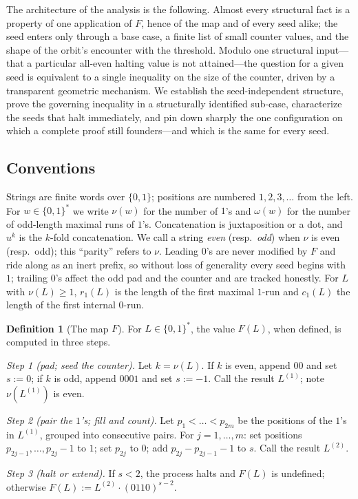 \documentclass[11pt,reqno]{amsart}
\theoremstyle{plain}
\theoremstyle{definition}
\newtheorem{definition}{Definition}
\theoremstyle{remark}
\begin{document}
The architecture of the analysis is the following. Almost every structural fact is a property of one application of $F$, hence of the map and of every seed alike; the seed enters only through a base case, a finite list of small counter values, and the shape of the orbit's encounter with the threshold. Modulo one structural input---that a particular all-even halting value is not attained---the question for a given seed is equivalent to a single inequality on the size of the counter, driven by a transparent geometric mechanism. We establish the seed-independent structure, prove the governing inequality in a structurally identified sub-case, characterize the seeds that halt immediately, and pin down sharply the one configuration on which a complete proof still founders---and which is the same for every seed.

\subsection*{Conventions} Strings are finite words over $\{0,1\}$; positions are numbered $1,2,3,\dots$ from the left. For $w\in\{0,1\}^*$ we write $\nu(w)$ for the number of $1$'s and $\omega(w)$ for the number of odd-length maximal runs of $1$'s. Concatenation is juxtaposition or a dot, and $u^k$ is the $k$-fold concatenation. We call a string \emph{even} (resp.\ \emph{odd}) when $\nu$ is even (resp.\ odd); this ``parity'' refers to $\nu$. Leading $0$'s are never modified by $F$ and ride along as an inert prefix, so without loss of generality every seed begins with $1$; trailing $0$'s affect the odd pad and the counter and are tracked honestly. For $L$ with $\nu(L)\ge 1$, $r_1(L)$ is the length of the first maximal $1$-run and $c_1(L)$ the length of the first internal $0$-run.

\begin{definition}[The map $F$]\label{def:F}
For $L\in\{0,1\}^*$, the value $F(L)$, when defined, is computed in three steps.

\emph{Step 1 (pad; seed the counter).} Let $k=\nu(L)$. If $k$ is even, append $00$ and set $s:=0$; if $k$ is odd, append $0001$ and set $s:=-1$. Call the result $L^{(1)}$; note $\nu(L^{(1)})$ is even.

\emph{Step 2 (pair the $1$'s; fill and count).} Let $p_1<\dots<p_{2m}$ be the positions of the $1$'s in $L^{(1)}$, grouped into consecutive pairs. For $j=1,\dots,m$: set positions $p_{2j-1},\dots,p_{2j}-1$ to $1$; set $p_{2j}$ to $0$; add $p_{2j}-p_{2j-1}-1$ to $s$. Call the result $L^{(2)}$.

\emph{Step 3 (halt or extend).} If $s<2$, the process halts and $F(L)$ is undefined; otherwise $F(L):=L^{(2)}\cdot(0110)^{s-2}$.
\end{definition}
\end{document}
